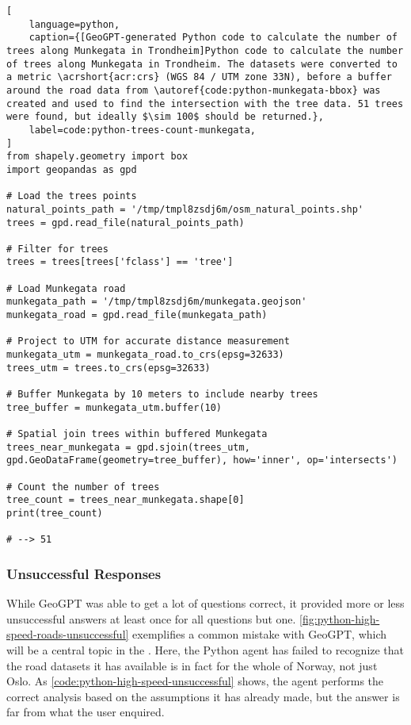 \begin{lstlisting}[
    language=python,
    caption={[GeoGPT-generated Python code to calculate the number of trees along Munkegata in Trondheim]Python code to calculate the number of trees along Munkegata in Trondheim. The datasets were converted to a metric \acrshort{acr:crs} (WGS 84 / UTM zone 33N), before a buffer around the road data from \autoref{code:python-munkegata-bbox} was created and used to find the intersection with the tree data. 51 trees were found, but ideally $\sim 100$ should be returned.},
    label=code:python-trees-count-munkegata,
]
from shapely.geometry import box
import geopandas as gpd

# Load the trees points
natural_points_path = '/tmp/tmpl8zsdj6m/osm_natural_points.shp'
trees = gpd.read_file(natural_points_path)

# Filter for trees
trees = trees[trees['fclass'] == 'tree']

# Load Munkegata road
munkegata_path = '/tmp/tmpl8zsdj6m/munkegata.geojson'
munkegata_road = gpd.read_file(munkegata_path)

# Project to UTM for accurate distance measurement
munkegata_utm = munkegata_road.to_crs(epsg=32633)
trees_utm = trees.to_crs(epsg=32633)

# Buffer Munkegata by 10 meters to include nearby trees
tree_buffer = munkegata_utm.buffer(10)

# Spatial join trees within buffered Munkegata
trees_near_munkegata = gpd.sjoin(trees_utm, gpd.GeoDataFrame(geometry=tree_buffer), how='inner', op='intersects')

# Count the number of trees
tree_count = trees_near_munkegata.shape[0]
print(tree_count)

# --> 51
\end{lstlisting}

\FloatBarrier
\subsubsection{Unsuccessful Responses}

While GeoGPT was able to get a lot of questions correct, it provided more or less unsuccessful answers at least once for all questions but one. \autoref{fig:python-high-speed-roads-unsuccessful} exemplifies a common mistake with GeoGPT, which will be a central topic in the . Here, the Python agent has failed to recognize that the road datasets it has available is in fact for the whole of Norway, not just Oslo. As \autoref{code:python-high-speed-unsuccessful} shows, the agent performs the correct analysis based on the assumptions it has already made, but the answer is far from what the user enquired.

